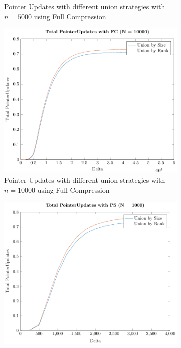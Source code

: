 \begin{figure}[ht]
\begin{subfigure}{0.32\textwidth}
        \caption{Pointer Updates with different union strategies with $n = 5000$ using Full Compression}
    \end{subfigure}%
    \hfill
    \begin{subfigure}{0.32\textwidth}
        \centering
        \includegraphics[width=\textwidth]{../images/plotFCNonFull10000_PointerUpdates.pdf}
        \caption{Pointer Updates with different union strategies with $n = 10000$ using Full Compression}
    \end{subfigure}
    \begin{subfigure}{0.32\textwidth}
        \centering
        \includegraphics[width=\textwidth]{../images/plotPSNonFull1000_PointerUpdates.pdf}

\end{subfigure}
\end{figure}
